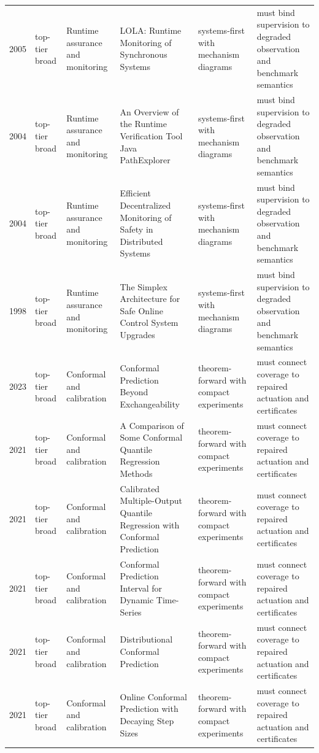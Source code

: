 \begin{longtable}{p{}p{}p{}p{}p{}p{}}
2005 & top-tier broad & Runtime assurance and monitoring & LOLA: Runtime Monitoring of Synchronous Systems & systems-first with mechanism diagrams & must bind supervision to degraded observation and benchmark semantics\\
2004 & top-tier broad & Runtime assurance and monitoring & An Overview of the Runtime Verification Tool Java PathExplorer & systems-first with mechanism diagrams & must bind supervision to degraded observation and benchmark semantics\\
2004 & top-tier broad & Runtime assurance and monitoring & Efficient Decentralized Monitoring of Safety in Distributed Systems & systems-first with mechanism diagrams & must bind supervision to degraded observation and benchmark semantics\\
1998 & top-tier broad & Runtime assurance and monitoring & The Simplex Architecture for Safe Online Control System Upgrades & systems-first with mechanism diagrams & must bind supervision to degraded observation and benchmark semantics\\
2023 & top-tier broad & Conformal and calibration & Conformal Prediction Beyond Exchangeability & theorem-forward with compact experiments & must connect coverage to repaired actuation and certificates\\
2021 & top-tier broad & Conformal and calibration & A Comparison of Some Conformal Quantile Regression Methods & theorem-forward with compact experiments & must connect coverage to repaired actuation and certificates\\
2021 & top-tier broad & Conformal and calibration & Calibrated Multiple-Output Quantile Regression with Conformal Prediction & theorem-forward with compact experiments & must connect coverage to repaired actuation and certificates\\
2021 & top-tier broad & Conformal and calibration & Conformal Prediction Interval for Dynamic Time-Series & theorem-forward with compact experiments & must connect coverage to repaired actuation and certificates\\
2021 & top-tier broad & Conformal and calibration & Distributional Conformal Prediction & theorem-forward with compact experiments & must connect coverage to repaired actuation and certificates\\
2021 & top-tier broad & Conformal and calibration & Online Conformal Prediction with Decaying Step Sizes & theorem-forward with compact experiments & must connect coverage to repaired actuation and certificates\\

\end{longtable}
